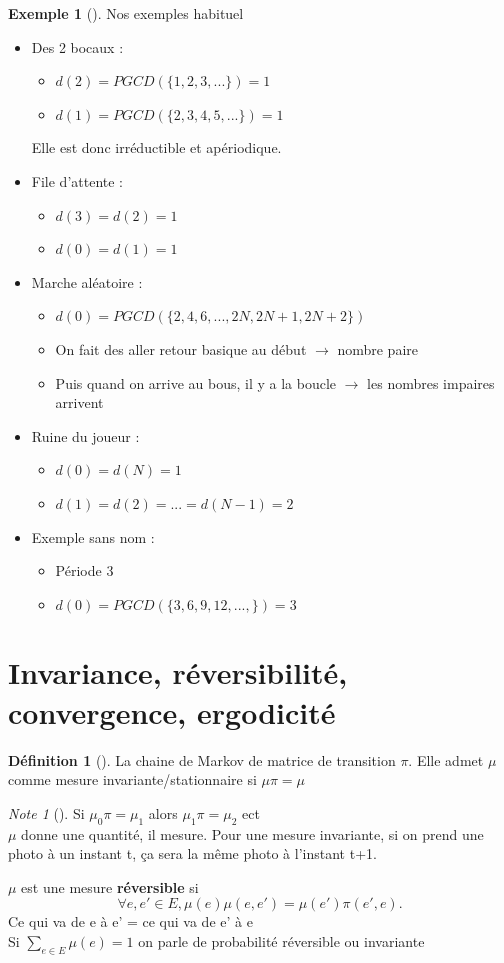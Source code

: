 \documentclass{article}
\theoremstyle{plain}%
\theoremstyle{definition}
\newtheorem{defn}{Définition}[section]
\newtheorem{exmp}{Exemple}[section]
\theoremstyle{remark}
\newtheorem*{note}{Note}
\begin{document}
\begin{exmp}[]
	Nos exemples habituel \begin{itemize}
		\item Des 2 bocaux : \begin{itemize}
			\item $ d(2) = PGCD(\{1,2,3,...\}) = 1$
			\item $ d(1) = PGCD(\{2,3,4,5,...\})= 1 $  
		\end{itemize}
		Elle est donc irréductible et apériodique.
	\item File d'attente : \begin{itemize}
		\item $ d(3) = d(2) =1 $
		\item $ d(0) = d(1)= 1 $  
	\end{itemize}
	\item Marche aléatoire : \begin{itemize}
		\item $ d(0) = PGCD(\{2,4,6,..., 2N, 2N+1, 2N+2\}) $
		\item On fait des aller retour basique au début $\rightarrow$ nombre paire 
		\item Puis quand on arrive au bous, il y a la boucle $\rightarrow$ les nombres impaires arrivent
	\end{itemize}
	\item Ruine du joueur : \begin{itemize}
		\item $ d(0) = d(N) = 1 $
		\item $ d(1) = d(2) = ... = d(N-1) = 2 $  
	\end{itemize}
	\item Exemple sans nom : \begin{itemize}
		\item Période 3
		\item $ d(0) = PGCD (\{3,6,9,12, ..., \})=3 $ 
	\end{itemize}
	\end{itemize}
\end{exmp}

\section{Invariance, réversibilité, convergence, ergodicité}
\begin{defn}[]
	La chaine de Markov de matrice de transition $ \pi  $. Elle admet $ \mu  $ comme mesure invariante/stationnaire si $ \mu \pi = \mu  $ 
	\begin{note}[]
		Si $ \mu _0 \pi = \mu _1$ alors $ \mu _1 \pi = \mu _2$ ect \\
		$ \mu  $ donne une quantité, il mesure. Pour une mesure invariante, si on prend une photo à un instant t, ça sera la même photo à l'instant t+1.
	\end{note} 
	$ \mu $ est une mesure \textbf{réversible} si 
	\[
		\forall e, e' \in E, \mu (e) \mu (e,e') = \mu (e') \pi (e',e)
	.\]
	Ce qui va de e à e' = ce qui va de e' à e \\
	Si $ \sum_{e \in E}^{} \mu (e) = 1 $ on parle de probabilité réversible ou invariante 
\end{defn}
\end{document}
